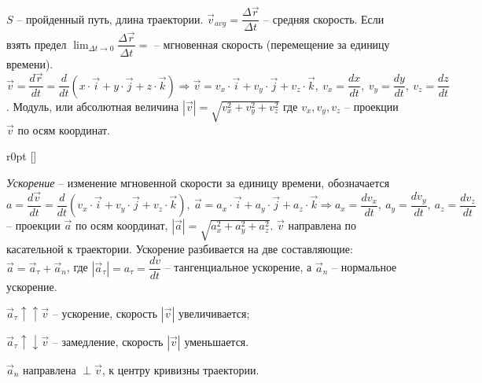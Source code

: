 \documentclass[9pt]{article}
\begin{document}
\par\(S\) -- пройденный путь, длина траектории. \(\vec v _{avg} = \dfrac{\Delta \vec r}{\Delta t}\) -- средняя скорость. Если взять предел \(\displaystyle\lim_{\Delta t \to 0}\dfrac{\Delta\vec r}{\Delta t} =\)  -- мгновенная скорость (перемещение за единицу времени). \(\vec v = \dfrac{d\vec r}{dt} = \dfrac{d}{dt}(x\cdot\vec{i} + y\cdot\vec{j} + z\cdot\vec{k}) \Rightarrow \vec v = v_x\cdot\vec i + v_y\cdot\vec j + v_z\cdot\vec k,\ v_x=\dfrac{dx}{dt},\ v_y=\dfrac{dy}{dt},\ v_z=\dfrac{dz}{dt}\). Модуль, или абсолютная величина \(|\vec v|=\sqrt{v_x^2+v_y^2+v_z^2}\) где \(v_x,v_y,v_z\) -- проекции \(\vec v\) по осям координат.

\begin{wrapfigure}[6]{r}{0pt}
\raisebox{0pt}[\dimexpr{}\baselineskip\relax]{
}
\end{wrapfigure}

\par\textit{Ускорение} -- изменение мгновенной скорости за единицу времени, обозначается \(a = \dfrac{d\vec v}{dt}=\dfrac{d}{dt}(v_x\cdot\vec i + v_y\cdot\vec j + v_z\cdot\vec k),\ \vec a = a_x\cdot\vec i + a_y\cdot\vec j + a_z\cdot\vec k \Rightarrow a_x = \dfrac{dv_x}{dt},\ a_y = \dfrac{dv_y}{dt},\ a_z = \dfrac{dv_z}{dt}\) -- проекции \(\vec a\) по осям координат, \(|\vec a| = \sqrt{a_x^2+a_y^2+a_z^2}\).
 \(\vec v\) направлена по касательной к траектории. Ускорение разбивается на две составляющие: \(\vec a = \vec a_\tau + \vec a_n\), где \(|\vec a_\tau| = a_\tau = \dfrac{dv}{dt}\) -- тангенциальное ускорение, а \(\vec a_n\) -- нормальное ускорение.
\par\(\vec a_\tau\uparrow\uparrow\vec v\) -- ускорение, скорость \(|\vec v|\) увеличивается;
\par\(\vec a_\tau\uparrow\downarrow\vec v\) -- замедление, скорость \(|\vec v|\) уменьшается.
\par\(\vec a_n\) направлена \(\perp\vec{v}\), к центру кривизны траектории.
\end{document}
